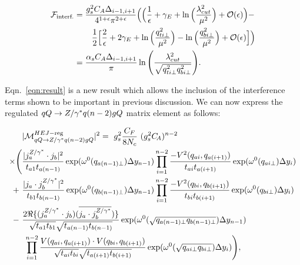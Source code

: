 		\begin{align}
		\begin{split}
			\mathcal{F}_{\text{interf.}} &= \frac{g_s^2C_A\Delta_{i-1, i+1}}{4^{1+\epsilon}\pi^{2+\epsilon}}
			\Big(\Big(\frac{1}{\epsilon} + \gamma_E +  \ln\Big(\frac{\lambda_{cut}^2}{\mu^2}\Big) +
			\mathcal{O}(\epsilon)\Big) - \\
			&\hspace{0.75cm}\frac{1}{2}\Big[\frac{2}{\epsilon} + 2 \gamma_E +
			\ln\Big(\frac{q_{ti\perp}^2}{\mu^2}\Big)
			- \ln\Big(\frac{q_{bi\perp}^2}{\mu^2}\Big) +
			\mathcal{O}(\epsilon)\Big]\Big) \\
			&= \frac{\alpha_sC_A\Delta_{i-1, i+1}}{\pi}\ln\Bigg(\frac{\lambda_{cut}^2}{\sqrt{q_{ti\perp}^2
			q_{bi\perp}^2}}\Bigg).
			\label{eqn:result}
		\end{split}
		\end{align}

		Eqn.~\eqref{eqn:result} is a new result which allows the inclusion of the interference terms shown
		to be important in previous discussion.  We can now express the regulated $qQ\to Z/\gamma^* q(n-2)gQ$
		matrix element as follows:

		\begin{align}
		  \label{eq:allordereg}
		  \begin{split}
		    &|\mathcal{M}^{HEJ-{\rm reg}}_{qQ\to \zg q(n-2)gQ}|^2 =\ g_s^2 \frac{C_F}{8N_c}\ ( g_s^2
		    \Ca)^{n-2}\  \\  \times \Bigg(& \frac{| j_a^{\zg}\cdot
		      j_b|^2}{t_{a1}t_{a(n-1)}}
		    \exp(\omega^0(q_{a(n-1)\perp})\Delta y_{n-1}) \prod^{n-2}_{i=1} \frac{-V^2(q_{ai},
		      q_{a(i+1)})}{t_{ai} t_{a(i+1)}} \exp(\omega^0(q_{ai\perp})\Delta y_i)\\
		    +\ &\frac{|j_a \cdot j_b^{\zg} |^2}{t_{b1}t_{b(n-1)}} \exp(\omega^0(q_{b(n-1)\perp})\Delta y_{n-1})
		    \prod^{n-2}_{i=1}\frac{-V^2(q_{bi}, q_{b(i+1)})}{t_{bi} t_{b(i+1)}} \exp(\omega^0(q_{bi\perp})\Delta y_i) \\
		    -\ &\frac{2\Re\{ (j_a^{\zg}\cdot j_b)(\overline{j_a \cdot
		        j_b^{\zg}})\}}{\sqrt{t_{a1}t_{b1}}\sqrt{t_{a(n-1)} t_{b(n-1)}}} \exp(\omega^0(\sqrt{q_{a(n-1)\perp}q_{b(n-1)\perp}})\Delta y_{n-1})\\
		    & \; \prod^{n-2}_{i=1}\frac{V(q_{ai}, q_{a(i+1)})\cdot V(q_{bi},
		      q_{b(i+1)})}{\sqrt{t_{ai}t_{bi}} \sqrt{t_{a(i+1)}t_{b(i+1)}}}\exp(\omega^0(\sqrt{q_{ai\perp}q_{bi\perp}})\Delta y_{i})\Bigg),
		  \end{split}
		\end{align}

